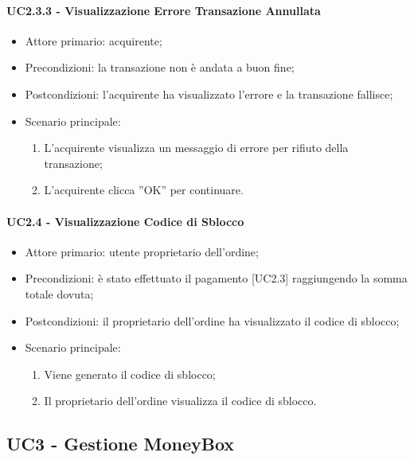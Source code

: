 \paragraph{UC2.3.3 - Visualizzazione Errore Transazione Annullata}

\begin{itemize}
    \item Attore primario: acquirente;
    \item Precondizioni: la transazione non è andata a buon fine;
    \item Postcondizioni: l'acquirente ha visualizzato l'errore e la transazione fallisce;
    \item Scenario principale:
          \begin{enumerate}
              \item L'acquirente visualizza un messaggio di errore per rifiuto della transazione;
              \item L'acquirente clicca ”OK” per continuare.
          \end{enumerate}
\end{itemize}

\paragraph{UC2.4 - Visualizzazione Codice di Sblocco}

\begin{itemize}
    \item Attore primario: utente proprietario dell'ordine;
    \item Precondizioni: è stato effettuato il pagamento [UC2.3] raggiungendo la somma totale dovuta;
    \item Postcondizioni: il proprietario dell'ordine ha visualizzato il codice di sblocco;
    \item Scenario principale:
          \begin{enumerate}
              \item Viene generato il codice di sblocco;
              \item Il proprietario dell'ordine visualizza il codice di sblocco.
          \end{enumerate}
\end{itemize}

\subsection{UC3 - Gestione MoneyBox}

